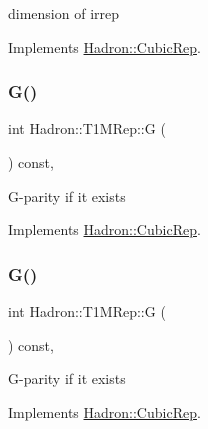 dimension of irrep 

Implements \mbox{\hyperlink{structHadron_1_1CubicRep_ac178d14064f037a66af4b9fb4b312d51}{Hadron\+::\+Cubic\+Rep}}.

\mbox{\label{structHadron_1_1T1MRep_ae0742a7a1d446b771a85df3c9c8d8f28}} 
\subsubsection{\texorpdfstring{G()}{G()}\hspace{0.1cm}{\footnotesize\ttfamily [1/2]}}
{\footnotesize\ttfamily int Hadron\+::\+T1\+M\+Rep\+::G (\begin{DoxyParamCaption}{ }\end{DoxyParamCaption}) const\hspace{0.3cm}{\ttfamily [inline]}, {\ttfamily [virtual]}}

G-\/parity if it exists 

Implements \mbox{\hyperlink{structHadron_1_1CubicRep_a52104e43266d1614c00bbd1c3b395458}{Hadron\+::\+Cubic\+Rep}}.

\mbox{\label{structHadron_1_1T1MRep_ae0742a7a1d446b771a85df3c9c8d8f28}} 
\subsubsection{\texorpdfstring{G()}{G()}\hspace{0.1cm}{\footnotesize\ttfamily [2/2]}}
{\footnotesize\ttfamily int Hadron\+::\+T1\+M\+Rep\+::G (\begin{DoxyParamCaption}{ }\end{DoxyParamCaption}) const\hspace{0.3cm}{\ttfamily [inline]}, {\ttfamily [virtual]}}

G-\/parity if it exists 

Implements \mbox{\hyperlink{structHadron_1_1CubicRep_a52104e43266d1614c00bbd1c3b395458}{Hadron\+::\+Cubic\+Rep}}.

\mbox{\label{structHadron_1_1T1MRep_afd1a046d8c258d11503b579df7489634}} 
